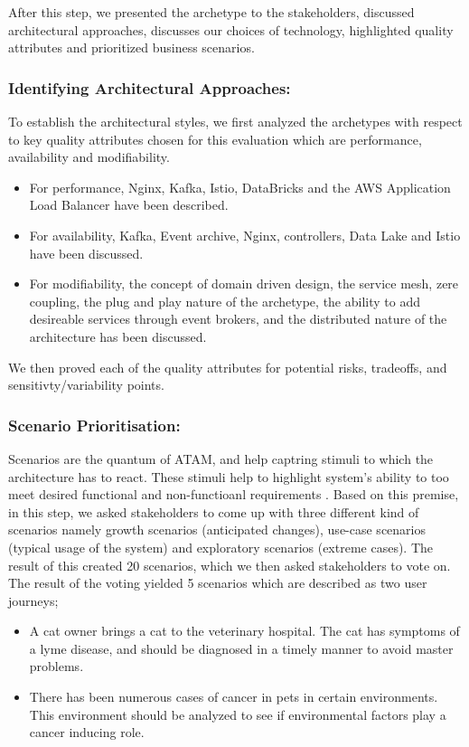 \documentclass[review]{elsarticle}
\begin{document}
After this step, we presented the archetype to the stakeholders, discussed architectural approaches, discusses our choices of technology, highlighted quality attributes and prioritized business scenarios.

\subsubsection{Identifying Architectural Approaches:} To establish the architectural styles, we first analyzed the archetypes with respect to key quality attributes chosen for this evaluation which are performance, availability and modifiability. 

\begin{itemize}
    \item For performance, Nginx, Kafka, Istio, DataBricks and the AWS Application Load Balancer have been described.
    \item For availability, Kafka, Event archive, Nginx, controllers, Data Lake and Istio have been discussed. 
    \item For modifiability, the concept of domain driven design, the service mesh, zere coupling, the plug and play nature of the archetype, the ability to add desireable services through event brokers, and the distributed nature of the architecture has been discussed.
\end{itemize}

We then proved each of the quality attributes for potential risks, tradeoffs, and sensitivty/variability points. 

\subsubsection{Scenario Prioritisation:}

Scenarios are the quantum of ATAM, and help captring stimuli to which the architecture has to react. These stimuli help to highlight system's ability to too meet desired functional and non-functioanl requirements \cite{ATAM}. Based on this premise, in this step, we asked stakeholders to come up with three different kind of scenarios namely growth scenarios (anticipated changes), use-case scenarios (typical usage of the system) and exploratory scenarios (extreme cases). The result of this created 20 scenarios, which we then asked stakeholders to vote on. The result of the voting yielded 5 scenarios which are described as two user journeys; 

\begin{itemize}
    \item A cat owner brings a cat to the veterinary hospital. The cat has symptoms of a lyme disease, and should be diagnosed in a timely manner to avoid master problems.
    \item There has been numerous cases of cancer in pets in certain environments. This environment should be analyzed to see if environmental factors play a cancer inducing role. 
\end{itemize}
\end{document}
